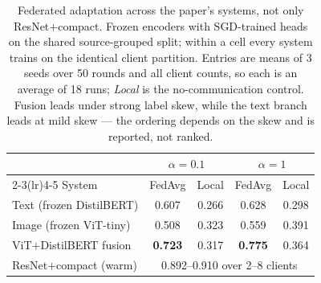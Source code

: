 
\begin{table}[t]
\caption{Federated adaptation across the paper's systems, not only ResNet$+$compact. Frozen encoders with SGD-trained heads on the shared source-grouped split; within a cell every system trains on the identical client partition. Entries are means of 3 seeds over 50 rounds and all client counts, so each is an average of 18 runs; \emph{Local} is the no-communication control. Fusion leads under strong label skew, while the text branch leads at mild skew --- the ordering depends on the skew and is reported, not ranked.}
\label{tab:all_systems_fed}
\centering\footnotesize
\setlength\tabcolsep{4.0pt}
\begin{tabular}{lcccc}
\toprule
& \multicolumn{2}{c}{$\alpha=0.1$} & \multicolumn{2}{c}{$\alpha=1$}\\
\cmidrule(lr){2-3}\cmidrule(lr){4-5}
System & FedAvg & Local & FedAvg & Local\\
\midrule
Text (frozen DistilBERT) & 0.607 & 0.266 & 0.628 & 0.298\\
Image (frozen ViT-tiny) & 0.508 & 0.323 & 0.559 & 0.391\\
ViT$+$DistilBERT fusion & \textbf{0.723} & 0.317 & \textbf{0.775} & 0.364\\
\midrule
ResNet$+$compact (warm) & \multicolumn{4}{c}{0.892--0.910 over 2--8 clients}\\
\bottomrule
\end{tabular}
\end{table}
